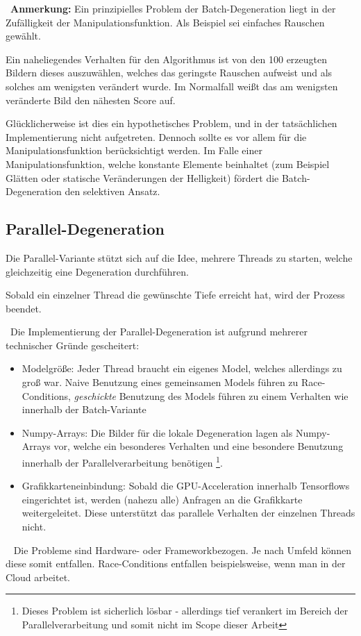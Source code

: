 ~\newline \textbf{Anmerkung:} Ein prinzipielles Problem der Batch-Degeneration liegt in der Zufälligkeit der Manipulationsfunktion. Als Beispiel sei einfaches Rauschen gewählt. 

Ein naheliegendes Verhalten für den Algorithmus ist von den 100 erzeugten Bildern dieses auszuwählen, welches das geringste Rauschen aufweist und als solches am wenigsten verändert wurde. Im Normalfall weißt das am wenigsten veränderte Bild den nähesten Score auf. 

Glücklicherweise ist dies ein hypothetisches Problem, und in der tatsächlichen Implementierung nicht aufgetreten. Dennoch sollte es vor allem für die Manipulationsfunktion berücksichtigt werden. Im Falle einer Manipulationsfunktion, welche konstante Elemente beinhaltet (zum Beispiel Glätten oder statische Veränderungen der Helligkeit) fördert die Batch-Degeneration den selektiven Ansatz.
\subsection{Parallel-Degeneration}
Die Parallel-Variante stützt sich auf die Idee, mehrere Threads zu starten, welche gleichzeitig eine Degeneration durchführen.

Sobald ein einzelner Thread die gewünschte Tiefe erreicht hat, wird der Prozess beendet. 

~\newline Die Implementierung der Parallel-Degeneration ist aufgrund mehrerer technischer Gründe gescheitert: 

\begin{itemize}
	\item Modelgröße: Jeder Thread braucht ein eigenes Model, welches allerdings zu groß war. Naive Benutzung eines gemeinsamen Models führen zu Race-Conditions, \textit{geschickte} Benutzung des Models führen zu einem Verhalten wie innerhalb der Batch-Variante
	\item Numpy-Arrays: Die Bilder für die lokale Degeneration lagen als Numpy-Arrays vor, welche ein besonderes Verhalten und eine besondere Benutzung innerhalb der Parallelverarbeitung benötigen \footnote{Dieses Problem ist sicherlich lösbar - allerdings tief verankert im Bereich der Parallelverarbeitung und somit nicht im Scope dieser Arbeit}. 
	\item Grafikkarteneinbindung: Sobald die GPU-Acceleration innerhalb Tensorflows eingerichtet ist, werden (nahezu alle) Anfragen an die Grafikkarte weitergeleitet. Diese unterstützt das parallele Verhalten der einzelnen Threads nicht. 
\end{itemize} 
~\newline 
Die Probleme sind Hardware- oder Frameworkbezogen. Je nach Umfeld können diese somit entfallen. Race-Conditions entfallen beispielsweise, wenn man in der Cloud arbeitet.

